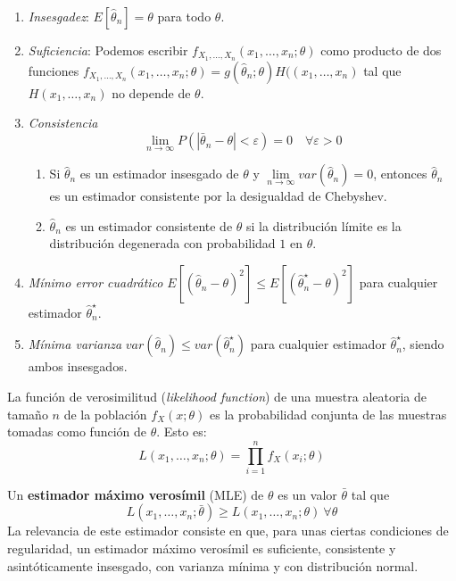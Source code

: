 	\begin{enumerate}
	\item \textit{Insesgadez}: 
			$E[\hat{\theta}_n] = \theta$ para todo $\theta$.
	\item \textit{Suficiencia}: Podemos escribir
			$f_{X_1, \dots, X_n}(x_1, \dots, x_n; \theta)$ como producto de dos funciones $f_{X_1, \dots, X_n}(x_1, \dots, x_n; \theta) = g(\hat{\theta}_n; \theta) H((x_1, \dots, x_n)$ tal que $H(x_1, \dots, x_n)$ no depende de $\theta$.
	\item \textit{Consistencia}
		\[ \lim_{n \rightarrow \infty} P(|\bar{\theta}_n - \theta| < \varepsilon) = 0 \quad \forall \varepsilon > 0 \]
	\begin{enumerate}
		\item Si $\hat{\theta}_n$ es un estimador insesgado de $\theta$ y $\underset{n \rightarrow \infty}{\lim} var(\hat{\theta}_n) = 0$, entonces $\hat{\theta}_n$ es un estimador consistente por la desigualdad de Chebyshev.
		\item $\hat{\theta}_n$ es un estimador consistente de $\theta$ si la distribución límite es la distribución degenerada con probabilidad $1$ en $\theta$.
	\end{enumerate}
			
	\item \textit{Mínimo error cuadrático} 	$E[(\hat{\theta}_n - \theta)^2] \leq E[(\hat{\theta}_n^\star - \theta)^2]$ para cualquier estimador $\hat{\theta}_n^\star$.
	\item \textit{Mínima varianza} 	$var(\hat{\theta}_n) \leq var(\hat{\theta}^\star_n)$ para cualquier estimador $\hat{\theta}_n^\star$, siendo ambos insesgados.
	\end{enumerate}
	
\begin{definicion}
	La función de verosimilitud (\textit{likelihood function}) de una muestra aleatoria de tamaño $n$ de la población $f_X(x;\theta)$ es la probabilidad conjunta de las muestras tomadas como función de $\theta$. Esto es:
	\[ L(x_1, \dots, x_n; \theta) = 
		\prod\limits_{i=1}^n f_X(x_i;\theta)	\]
\end{definicion}

	Un \textbf{estimador máximo verosímil} (MLE) de $\theta$ es un valor $\bar{\theta}$ tal que 
	\[ L(x_1, \dots, x_n; \bar{\theta}) \geq 
			L(x_1, \dots, x_n; \theta) \ \forall \theta 	\]
	La relevancia de este estimador consiste en que, para unas ciertas condiciones de regularidad, un estimador máximo verosímil es suficiente, consistente y asintóticamente insesgado, con varianza mínima y con distribución normal.
	
